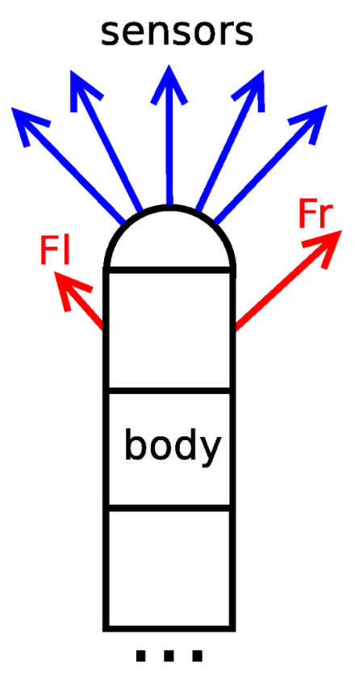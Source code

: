 \documentclass[10pt,a4paper]{article}
\begin{document}
\begin{figure}[!htb]
\begin{minipage}{.5\textwidth}
  \includegraphics[scale=0.5]{../../diagrams/snake_bot_schem.png}
  \label{img:Agent schematics}
\end{minipage}
\end{figure}
\end{document}

